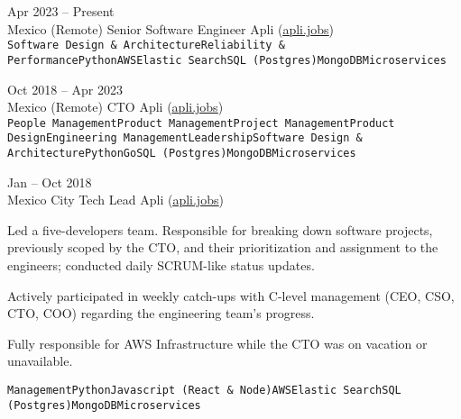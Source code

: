 \documentclass[9pt]{developercv} %
\begin{document}
\begin{entrylist}
    \entry
        {
            Apr 2023 -- Present
            \\\footnotesize{Mexico (Remote)}
        }
        {Senior Software Engineer}
        {Apli ({\href{https://apli.jobs/}{\underline{apli.jobs}}})}
        {
            \lorem \lorem\\

            \texttt{Software Design \& Architecture}\slashsep\texttt{Reliability \& Performance}\slashsep\texttt{Python}\slashsep\texttt{AWS}\slashsep\texttt{Elastic Search}\slashsep\texttt{SQL (Postgres)}\slashsep\texttt{MongoDB}\slashsep\texttt{Microservices}
        }

    \entry
        {Oct 2018 -- Apr 2023\\\footnotesize{Mexico (Remote)}}
        {CTO}
        {Apli ({\href{https://apli.jobs/}{\underline{apli.jobs}}})}
        {
            \lorem \lorem\\

            \texttt{People Management}\slashsep\texttt{Product Management}\slashsep\texttt{Project Management}\slashsep\texttt{Product Design}\slashsep\texttt{Engineering Management}\slashsep\texttt{Leadership}\slashsep\texttt{Software Design \& Architecture}\slashsep\texttt{Python}\slashsep\texttt{Go}\slashsep\texttt{SQL (Postgres)}\slashsep\texttt{MongoDB}\slashsep\texttt{Microservices}
        }

    \entry
        {
            Jan -- Oct 2018
            \\\footnotesize{Mexico City}
        }
        {Tech Lead}
        {Apli ({\href{https://apli.jobs/}{\underline{apli.jobs}}})}
        {

            Led a five-developers team. Responsible for breaking down software projects, previously scoped by the CTO, and their prioritization and assignment to the engineers; conducted daily SCRUM-like status updates. 

            Actively participated in weekly catch-ups with C-level management (CEO, CSO, CTO, COO) regarding the engineering team's progress.

            Fully responsible for AWS Infrastructure while the CTO was on vacation or unavailable.

            \texttt{Management}\slashsep\texttt{Python}\slashsep\texttt{Javascript (React \& Node)}\slashsep\texttt{AWS}\slashsep\texttt{Elastic Search}\slashsep\texttt{SQL (Postgres)}\slashsep\texttt{MongoDB}\slashsep\texttt{Microservices}
        }


\end{entrylist}
\end{document}
